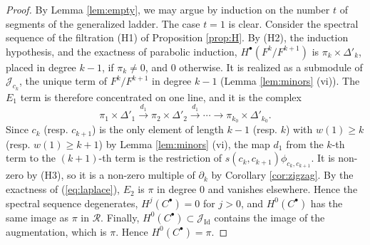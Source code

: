 \documentclass[a4paper,12pt,leqno]{amsart}
\newcommand{\caJ}{\mathcal{J}}
\newcommand{\caR}{\mathcal{R}}
\theoremstyle{plain}
\theoremstyle{definition}
\theoremstyle{definition}
\newcommand{\Id}{\mathrm{Id}}
\begin{document}
\begin{proof}
By Lemma \ref{lem:empty}, we may argue by induction on the number $t$ of segments of the generalized ladder.
The case $t=1$ is clear. Consider the spectral sequence of the filtration (H1) of Proposition \ref{prop:H}. By (H2), the
induction hypothesis,
and the exactness of parabolic induction, $H^\bullet(F^k/F^{k+1})$ is $\pi_k\times\Delta'_k$, placed in degree
 $k-1$, if $\pi_k\neq0$, and $0$ otherwise. It is realized as a submodule of $\caJ_{c_k}$, the unique term of
 $F^k/F^{k+1}$ in degree $k-1$ (Lemma \ref{lem:minors} (vi)). The $E_1$ term is therefore
 concentrated on one line, and it is the complex
\[\pi_1\times\Delta'_1\stackrel{d_1}{\rightarrow}\pi_2\times\Delta'_2\stackrel{d_1}{\rightarrow}\cdots\rightarrow\pi_{k_0}\times\Delta'_{k_0}.\]
Since $c_k$ (resp. $c_{k+1}$) is the only element of length $k-1$ (resp. $k$) with $w(1)\geq k$
(resp. $w(1)\geq k+1$) by Lemma \ref{lem:minors} (vi),
 the map $d_1$ from the $k$-th term to the $(k+1)$-th term is the restriction of
 $s(c_k,c_{k+1})\phi_{c_k,c_{k+1}}$.
  It is non-zero by (H3), so it is a non-zero multiple of $\partial_k$ by Corollary \ref{cor:zigzag}.
  By the exactness of (\ref{eq:laplace}), $E_2$ is $\pi$ in degree $0$ and vanishes elsewhere.
  Hence the spectral sequence degenerates, $H^j(C^\bullet)=0$ for $j>0$, and $H^0(C^\bullet)$ has
  the same image as $\pi$ in $\caR$. Finally, $H^0(C^\bullet)\subset\caJ_{\Id}$ contains the image of
  the augmentation, which is $\pi$. Hence $H^0(C^\bullet)=\pi$.
\end{proof}
\end{document}
